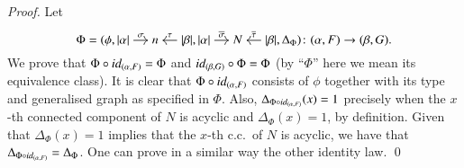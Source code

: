 \begin{proof}
    Let 
    \[
    \Phi = (\phi,
    \begin{tikzcd}[cramped,sep=small]
    \length\alpha \ar[r,"\sigma"] & n & \length\beta \ar[l,"\tau"']
    \end{tikzcd},
    \begin{tikzcd}[cramped,sep=small]
    \length\alpha \ar[r,"\overline\sigma"] & N & \length\beta \ar[l,"\overline\tau"']
    \end{tikzcd},
    \Delta_\Phi
    ) \colon (\alpha,F) \to (\beta,G). 
    \]
    We prove that $\Phi \circ \mathop{\textit{id}_{(\alpha,F)}} = \Phi$ and ${\mathop{\textit{id}_{(\beta,G)}}} \circ \Phi = \Phi$ (by ``$\Phi$'' here we mean its equivalence class). It is clear that $\Phi \circ {\ensuremath{\mathop{\textit{id}_{(\alpha,F)}}}}$ consists of $\phi$ together with its type and generalised graph as specified in $\Phi$. Also, $\Delta_{\Phi \circ \mathop{\textit{id}_{(\alpha,F)}}}(x) = 1$ precisely when the $x$-th connected component of $N$ is acyclic and $\Delta_{\Phi}(x)=1$, by definition. Given that $\Delta_\Phi(x)=1$ implies that the $x$-th c.c.\ of $N$ is acyclic, we have that  $\Delta_{\Phi \circ \mathop{\textit{id}_{(\alpha,F)}}} = \Delta_\Phi$. One can prove in a similar way the other identity law. \qed
    \end{proof}

